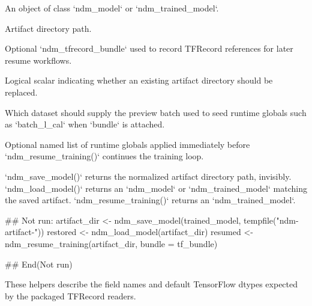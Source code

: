 \documentclass[a4paper]{book}
\begin{document}
\begin{Arguments}
\begin{ldescription}
\item[\code{x}] An object of class `ndm\_model` or `ndm\_trained\_model`.

\item[\code{path}] Artifact directory path.

\item[\code{bundle}] Optional `ndm\_tfrecord\_bundle` used to record TFRecord
references for later resume workflows.

\item[\code{overwrite}] Logical scalar indicating whether an existing artifact
directory should be replaced.

\item[\code{calibration\_source}] Which dataset should supply the preview batch used
to seed runtime globals such as `batch\_l\_cal` when `bundle` is attached.

\item[\code{train\_globals}] Optional named list of runtime globals applied
immediately before `ndm\_resume\_training()` continues the training loop.
\end{ldescription}
\end{Arguments}
%
\begin{Value}
`ndm\_save\_model()` returns the normalized artifact directory path,
invisibly. `ndm\_load\_model()` returns an `ndm\_model` or
`ndm\_trained\_model` matching the saved artifact. `ndm\_resume\_training()`
returns an `ndm\_trained\_model`.
\end{Value}
%
\begin{Examples}
\begin{ExampleCode}
## Not run: 
artifact_dir <- ndm_save_model(trained_model, tempfile("ndm-artifact-"))
restored <- ndm_load_model(artifact_dir)
resumed <- ndm_resume_training(artifact_dir, bundle = tf_bundle)

## End(Not run)

\end{ExampleCode}
\end{Examples}
%
\begin{Description}
These helpers describe the field names and default TensorFlow dtypes expected
by the packaged TFRecord readers.
\end{Description}
\end{document}

